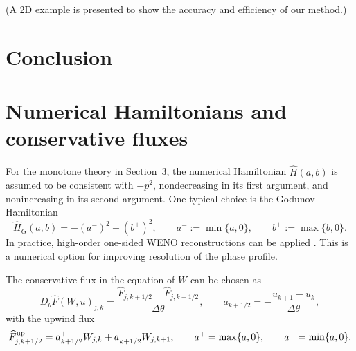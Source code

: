 \documentclass[11pt]{article}
\begin{document}
(A 2D example is presented to show the accuracy and efficiency of our method.)

\section{Conclusion} \label{sec:conclusion}



\appendix

\section{Numerical Hamiltonians and conservative fluxes}
\label{app:hamiltonian_flux}

For the monotone theory in Section~3, the numerical Hamiltonian
\(\widehat H(a,b)\) is assumed to be consistent with \(-p^2\), nondecreasing in
its first argument, and nonincreasing in its second argument.  One typical 
choice is the Godunov Hamiltonian
\begin{equation}
\label{eq:app_Godunov_H}
    \widehat H_G(a,b)
    =
    -(a^-)^2-(b^+)^2,
    \qquad
    a^-:=\min\{a,0\},
    \qquad
    b^+:=\max\{b,0\}.
\end{equation}
In practice, high-order one-sided WENO reconstructions can be applied \cite{JiangPeng, OsherShu, ShuHJ}.  
This is a numerical option for
improving resolution of the phase profile.  

The conservative flux in the equation of $W$ can be chosen as 
\[
    D_\theta\widehat F(W,u)_{j,k}
    =
    \frac{\widehat F_{j,k+1/2}-\widehat F_{j,k-1/2}}{\Delta\theta},
    \qquad
    a_{k+1/2}
    =
    -\frac{u_{k+1}-u_k}{\Delta\theta},
\]
with the upwind flux 
\begin{equation}
\label{eq:app_upwind_flux}
    \widehat F^{\rm up}_{j,k+1/2}
    =
    a_{k+1/2}^+ W_{j,k}
    +
    a_{k+1/2}^- W_{j,k+1},
    \qquad
    a^+=\max\{a,0\},
    \qquad
    a^-=\min\{a,0\}.
\end{equation}
\end{document}
